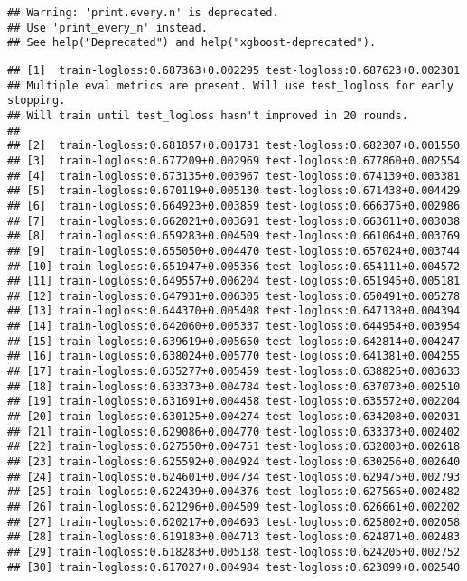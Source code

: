 \documentclass[
]{article}
\begin{document}
\begin{verbatim}
## Warning: 'print.every.n' is deprecated.
## Use 'print_every_n' instead.
## See help("Deprecated") and help("xgboost-deprecated").
\end{verbatim}

\begin{verbatim}
## [1]  train-logloss:0.687363+0.002295 test-logloss:0.687623+0.002301 
## Multiple eval metrics are present. Will use test_logloss for early stopping.
## Will train until test_logloss hasn't improved in 20 rounds.
## 
## [2]  train-logloss:0.681857+0.001731 test-logloss:0.682307+0.001550 
## [3]  train-logloss:0.677209+0.002969 test-logloss:0.677860+0.002554 
## [4]  train-logloss:0.673135+0.003967 test-logloss:0.674139+0.003381 
## [5]  train-logloss:0.670119+0.005130 test-logloss:0.671438+0.004429 
## [6]  train-logloss:0.664923+0.003859 test-logloss:0.666375+0.002986 
## [7]  train-logloss:0.662021+0.003691 test-logloss:0.663611+0.003038 
## [8]  train-logloss:0.659283+0.004509 test-logloss:0.661064+0.003769 
## [9]  train-logloss:0.655050+0.004470 test-logloss:0.657024+0.003744 
## [10] train-logloss:0.651947+0.005356 test-logloss:0.654111+0.004572 
## [11] train-logloss:0.649557+0.006204 test-logloss:0.651945+0.005181 
## [12] train-logloss:0.647931+0.006305 test-logloss:0.650491+0.005278 
## [13] train-logloss:0.644370+0.005408 test-logloss:0.647138+0.004394 
## [14] train-logloss:0.642060+0.005337 test-logloss:0.644954+0.003954 
## [15] train-logloss:0.639619+0.005650 test-logloss:0.642814+0.004247 
## [16] train-logloss:0.638024+0.005770 test-logloss:0.641381+0.004255 
## [17] train-logloss:0.635277+0.005459 test-logloss:0.638825+0.003633 
## [18] train-logloss:0.633373+0.004784 test-logloss:0.637073+0.002510 
## [19] train-logloss:0.631691+0.004458 test-logloss:0.635572+0.002204 
## [20] train-logloss:0.630125+0.004274 test-logloss:0.634208+0.002031 
## [21] train-logloss:0.629086+0.004770 test-logloss:0.633373+0.002402 
## [22] train-logloss:0.627550+0.004751 test-logloss:0.632003+0.002618 
## [23] train-logloss:0.625592+0.004924 test-logloss:0.630256+0.002640 
## [24] train-logloss:0.624601+0.004734 test-logloss:0.629475+0.002793 
## [25] train-logloss:0.622439+0.004376 test-logloss:0.627565+0.002482 
## [26] train-logloss:0.621296+0.004509 test-logloss:0.626661+0.002202 
## [27] train-logloss:0.620217+0.004693 test-logloss:0.625802+0.002058 
## [28] train-logloss:0.619183+0.004713 test-logloss:0.624871+0.002483 
## [29] train-logloss:0.618283+0.005138 test-logloss:0.624205+0.002752 
## [30] train-logloss:0.617027+0.004984 test-logloss:0.623099+0.002540 

\end{verbatim}
\end{document}
